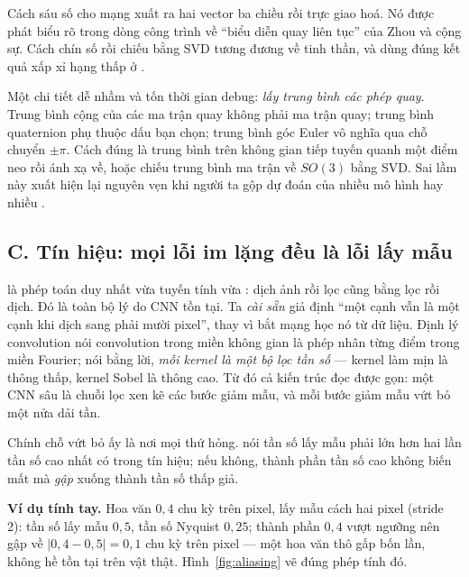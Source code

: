 \documentclass[../../../deep_learning.tex]{subfiles}
\begin{document}
Cách sáu số cho mạng xuất ra hai vector ba chiều rồi trực giao hoá. Nó được phát biểu rõ trong dòng công trình về ``biểu diễn quay liên tục'' của Zhou và cộng sự. Cách chín số rồi chiếu bằng SVD tương đương về tinh thần, và dùng đúng kết quả xấp xỉ hạng thấp ở .

Một chi tiết dễ nhầm và tốn thời gian debug: \emph{lấy trung bình các phép quay}. Trung bình cộng của các ma trận quay không phải ma trận quay; trung bình quaternion phụ thuộc dấu bạn chọn; trung bình góc Euler vô nghĩa qua chỗ chuyển \(\pm\pi\). Cách đúng là trung bình trên không gian tiếp tuyến quanh một điểm neo rồi ánh xạ về, hoặc chiếu trung bình ma trận về \(SO(3)\) bằng SVD. Sai lầm này xuất hiện lại nguyên vẹn khi người ta gộp dự đoán của nhiều mô hình hay nhiều .

\subsection{C. Tín hiệu: mọi lỗi im lặng đều là lỗi lấy mẫu}
 là phép toán duy nhất vừa tuyến tính vừa : dịch ảnh rồi lọc cũng bằng lọc rồi dịch. Đó là toàn bộ lý do CNN tồn tại. Ta \emph{cài sẵn} giả định ``một cạnh vẫn là một cạnh khi dịch sang phải mười pixel'', thay vì bắt mạng học nó từ dữ liệu. Định lý convolution nói convolution trong miền không gian là phép nhân từng điểm trong miền Fourier; nói bằng lời, \emph{mỗi kernel là một bộ lọc tần số} --- kernel làm mịn là thông thấp, kernel Sobel là thông cao. Từ đó cả kiến trúc đọc được gọn: một CNN sâu là chuỗi lọc xen kẽ các bước giảm mẫu, và mỗi bước giảm mẫu vứt bỏ một nửa dải tần.

Chính chỗ vứt bỏ ấy là nơi mọi thứ hỏng.  nói tần số lấy mẫu phải lớn hơn hai lần tần số cao nhất có trong tín hiệu; nếu không, thành phần tần số cao không biến mất mà \emph{gập} xuống thành tần số thấp giả.

\textbf{Ví dụ tính tay.} Hoa văn \(0{,}4\) chu kỳ trên pixel, lấy mẫu cách hai pixel (stride 2): tần số lấy mẫu \(0{,}5\), tần số Nyquist \(0{,}25\); thành phần \(0{,}4\) vượt ngưỡng nên gập về \(|0{,}4-0{,}5| = 0{,}1\) chu kỳ trên pixel --- một hoa văn thô gấp bốn lần, không hề tồn tại trên vật thật. Hình~\ref{fig:aliasing} vẽ đúng phép tính đó.
\end{document}
